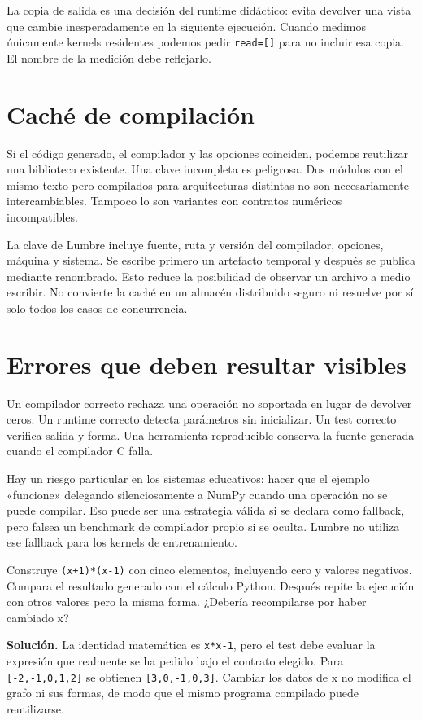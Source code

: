 \documentclass[12pt,a4paper,oneside]{report}
\begin{document}
La copia de salida es una decisión del runtime didáctico: evita devolver una vista que cambie inesperadamente en la siguiente ejecución. Cuando medimos únicamente kernels residentes podemos pedir \texttt{read=[]} para no incluir esa copia. El nombre de la medición debe reflejarlo.

\section{Caché de compilación}
Si el código generado, el compilador y las opciones coinciden, podemos reutilizar una biblioteca existente. Una clave incompleta es peligrosa. Dos módulos con el mismo texto pero compilados para arquitecturas distintas no son necesariamente intercambiables. Tampoco lo son variantes con contratos numéricos incompatibles.

La clave de Lumbre incluye fuente, ruta y versión del compilador, opciones, máquina y sistema. Se escribe primero un artefacto temporal y después se publica mediante renombrado. Esto reduce la posibilidad de observar un archivo a medio escribir. No convierte la caché en un almacén distribuido seguro ni resuelve por sí solo todos los casos de concurrencia.

\section{Errores que deben resultar visibles}
Un compilador correcto rechaza una operación no soportada en lugar de devolver ceros. Un runtime correcto detecta parámetros sin inicializar. Un test correcto verifica salida y forma. Una herramienta reproducible conserva la fuente generada cuando el compilador C falla.

Hay un riesgo particular en los sistemas educativos: hacer que el ejemplo «funcione» delegando silenciosamente a NumPy cuando una operación no se puede compilar. Eso puede ser una estrategia válida si se declara como fallback, pero falsea un benchmark de compilador propio si se oculta. Lumbre no utiliza ese fallback para los kernels de entrenamiento.

\begin{practica}
Construye \texttt{(x+1)*(x-1)} con cinco elementos, incluyendo cero y valores negativos. Compara el resultado generado con el cálculo Python. Después repite la ejecución con otros valores pero la misma forma. ¿Debería recompilarse por haber cambiado x?

\end{practica}
\textbf{Solución.} La identidad matemática es \texttt{x*x-1}, pero el test debe evaluar la expresión que realmente se ha pedido bajo el contrato elegido. Para \texttt{[-2,-1,0,1,2]} se obtienen \texttt{[3,0,-1,0,3]}. Cambiar los datos de x no modifica el grafo ni sus formas, de modo que el mismo programa compilado puede reutilizarse.
\end{document}
